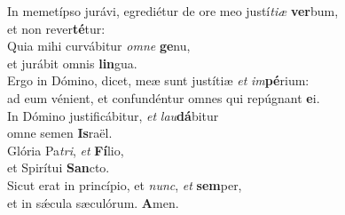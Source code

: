 \oddverse In memetípso jurávi, egrediétur de ore meo justí\textit{ti}\textit{æ} \textbf{ver}bum,~\*\\
\oddverse et non rever\textbf{té}tur:\\
\evenverse Quia mihi curvábitur \textit{om}\textit{ne} \textbf{ge}nu,~\*\\
\evenverse et jurábit omnis \textbf{lin}gua.\\
\oddverse Ergo in Dómino, dicet, meæ sunt justítiæ \textit{et} \textit{im}\textbf{pé}rium:~\*\\
\oddverse ad eum vénient, et confundéntur omnes qui repúgnant \textbf{e}i.\\
\evenverse In Dómino justificábitur, \textit{et} \textit{lau}\textbf{dá}bitur~\*\\
\evenverse omne semen \textbf{Is}raël.\\
\oddverse Glória Pa\textit{tri}, \textit{et} \textbf{Fí}lio,~\*\\
\oddverse et Spirítui \textbf{San}cto.\\
\evenverse Sicut erat in princípio, et \textit{nunc}, \textit{et} \textbf{sem}per,~\*\\
\evenverse et in sǽcula sæculórum. \textbf{A}men.\\
